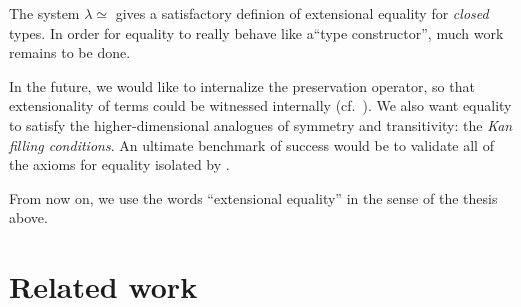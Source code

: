 \documentclass[10pt]{article}
\newcommand{\leeq}{\lambda {\eeq}}
\newcommand{\eeq}{\simeq}
\begin{document}
The system $\leeq$ gives a satisfactory definion of extensional
equality for \emph{closed} types.  In order for equality to really
behave like a``type constructor'', much work remains to be done.

In the future, we would like to internalize the preservation operator, so that
extensionality of terms could be witnessed internally (cf.\ \cite{intpar}).
We also want equality to satisfy the higher-dimensional analogues
of symmetry and transitivity: the \emph{Kan filling conditions}.
An ultimate benchmark of success would be to validate all
of the axioms for equality isolated by \cite[p.34]{coquand}.

From now on, we use the words ``extensional equality''
in the sense of the thesis above.

\section{Related work}
\end{document}
